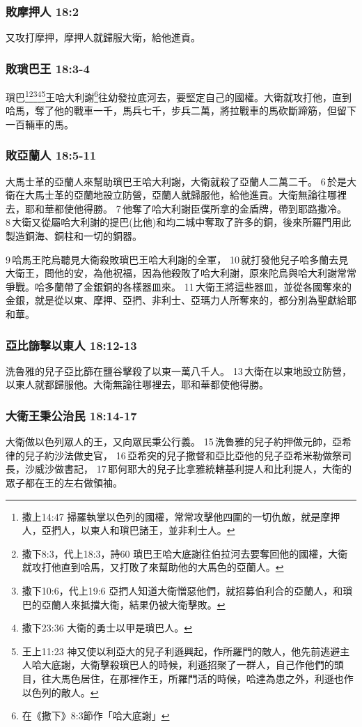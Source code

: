 \subsubsection{敗摩押人 18:2}
又攻打摩押，摩押人就歸服大衛，給他進貢。

\subsubsection{敗瑣巴王 18:3-4}
瑣巴\footnote{撒上14:47 掃羅執掌以色列的國權，常常攻擊他四圍的一切仇敵，就是摩押人，亞捫人，以東人和瑣巴諸王，並非利士人。}\footnote{撒下8:3，代上18:3，詩60 瑣巴王哈大底謝往伯拉河去要奪回他的國權，大衛就攻打他直到哈馬，又打敗了來幫助他的大馬色的亞蘭人。}\footnote{撒下10:6，代上19:6 亞捫人知道大衛憎惡他們，就招募伯利合的亞蘭人，和瑣巴的亞蘭人來抵擋大衛，結果仍被大衛擊敗。}\footnote{撒下23:36 大衛的勇士以甲是瑣巴人。}\footnote{王上11:23 神又使以利亞大的兒子利遜興起，作所羅門的敵人，他先前逃避主人哈大底謝，大衛擊殺瑣巴人的時候，利遜招聚了一群人，自己作他們的頭目，往大馬色居住，在那裡作王，所羅門活的時候，哈達為患之外，利遜也作以色列的敵人。}王哈大利謝\footnote{在《撒下》8:3節作「哈大底謝」}往幼發拉底河去，要堅定自己的國權。大衛就攻打他，直到哈馬，奪了他的戰車一千，馬兵七千，步兵二萬，將拉戰車的馬砍斷蹄筋，但留下一百輛車的馬。

\subsubsection{敗亞蘭人 18:5-11}
大馬士革的亞蘭人來幫助瑣巴王哈大利謝，大衛就殺了亞蘭人二萬二千。 6 於是大衛在大馬士革的亞蘭地設立防營，亞蘭人就歸服他，給他進貢。大衛無論往哪裡去，耶和華都使他得勝。 7 他奪了哈大利謝臣僕所拿的金盾牌，帶到耶路撒冷。 8 大衛又從屬哈大利謝的提巴(比他)和均二城中奪取了許多的銅，後來所羅門用此製造銅海、銅柱和一切的銅器。

9 哈馬王陀烏聽見大衛殺敗瑣巴王哈大利謝的全軍， 10 就打發他兒子哈多蘭去見大衛王，問他的安，為他祝福，因為他殺敗了哈大利謝，原來陀烏與哈大利謝常常爭戰。哈多蘭帶了金銀銅的各樣器皿來。 11 大衛王將這些器皿，並從各國奪來的金銀，就是從以東、摩押、亞捫、非利士、亞瑪力人所奪來的，都分別為聖獻給耶和華。

\subsubsection{亞比篩擊以東人 18:12-13}
洗魯雅的兒子亞比篩在鹽谷擊殺了以東一萬八千人。 13 大衛在以東地設立防營，以東人就都歸服他。大衛無論往哪裡去，耶和華都使他得勝。


\subsubsection{大衛王秉公治民 18:14-17}
大衛做以色列眾人的王，又向眾民秉公行義。 15 洗魯雅的兒子約押做元帥，亞希律的兒子約沙法做史官， 16 亞希突的兒子撒督和亞比亞他的兒子亞希米勒做祭司長，沙威沙做書記， 17 耶何耶大的兒子比拿雅統轄基利提人和比利提人，大衛的眾子都在王的左右做領袖。

